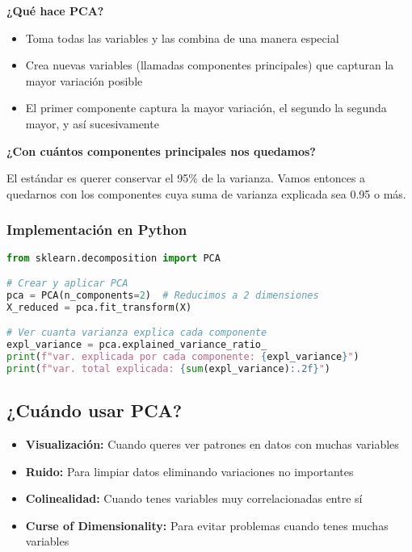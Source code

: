 \documentclass[12pt]{article}
\begin{document}
\vspace{1em}

\textbf{¿Qué hace PCA?} 
\begin{itemize}
    \item Toma todas las variables y las combina de una manera especial
    \item Crea nuevas variables (llamadas componentes principales) que capturan la mayor variación posible
    \item El primer componente captura la mayor variación, el segundo la segunda mayor, y así sucesivamente
\end{itemize}

\textbf{¿Con cuántos componentes principales nos quedamos?}

\vspace{0.5em}

El estándar es querer conservar el 95\% de la varianza. Vamos entonces a quedarnos con los componentes cuya suma de varianza explicada sea 0.95 o más.

\subsubsection{Implementación en Python}

\begin{lstlisting}[language=Python]
from sklearn.decomposition import PCA

# Crear y aplicar PCA
pca = PCA(n_components=2)  # Reducimos a 2 dimensiones
X_reduced = pca.fit_transform(X)

# Ver cuanta varianza explica cada componente
expl_variance = pca.explained_variance_ratio_
print(f"var. explicada por cada componente: {expl_variance}")
print(f"var. total explicada: {sum(expl_variance):.2f}")
\end{lstlisting}

\subsection{¿Cuándo usar PCA?}
\begin{itemize}
    \item \textbf{Visualización:} Cuando queres ver patrones en datos con muchas variables
    \item \textbf{Ruido:} Para limpiar datos eliminando variaciones no importantes
    \item \textbf{Colinealidad:} Cuando tenes variables muy correlacionadas entre sí
    \item \textbf{Curse of Dimensionality:} Para evitar problemas cuando tenes muchas variables
\end{itemize}
\end{document}
